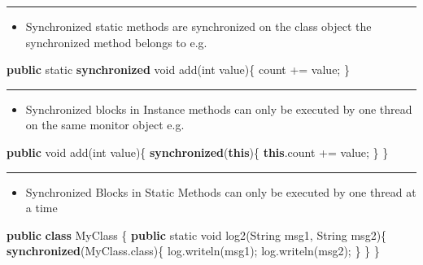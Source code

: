 \documentclass[11pt]{article}
\providecommand{\tightlist}{%
      \setlength{\itemsep}{0pt}\setlength{\parskip}{0pt}}
\newenvironment{Shaded}{}{}
\newcommand{\KeywordTok}[1]{\textcolor[rgb]{0.00,0.44,0.13}{\textbf{{#1}}}}
\newcommand{\DataTypeTok}[1]{\textcolor[rgb]{0.56,0.13,0.00}{{#1}}}
\newcommand{\FunctionTok}[1]{\textcolor[rgb]{0.02,0.16,0.49}{{#1}}}
\newcommand{\NormalTok}[1]{{#1}}
\newcommand{\BuiltInTok}[1]{{#1}}
\begin{document}
\begin{center}\rule{0.5\linewidth}{\linethickness}\end{center}

\begin{itemize}
\tightlist
\item
  Synchronized static methods are synchronized on the class object the
  synchronized method belongs to e.g.
\end{itemize}

\begin{Shaded}
\begin{Highlighting}[]
    \KeywordTok{public} \DataTypeTok{static} \KeywordTok{synchronized} \DataTypeTok{void} \FunctionTok{add}\NormalTok{(}\DataTypeTok{int}\NormalTok{ value)\{}
\NormalTok{        count += value;}
\NormalTok{    \}}
\end{Highlighting}
\end{Shaded}

\begin{center}\rule{0.5\linewidth}{\linethickness}\end{center}

\begin{itemize}
\tightlist
\item
  Synchronized blocks in Instance methods can only be executed by one
  thread on the same monitor object e.g.
\end{itemize}

\begin{Shaded}
\begin{Highlighting}[]
    \KeywordTok{public} \DataTypeTok{void} \FunctionTok{add}\NormalTok{(}\DataTypeTok{int}\NormalTok{ value)\{}
        \KeywordTok{synchronized}\NormalTok{(}\KeywordTok{this}\NormalTok{)\{}
            \KeywordTok{this}\NormalTok{.}\FunctionTok{count}\NormalTok{ += value;   }
\NormalTok{        \}}
\NormalTok{    \} }
\end{Highlighting}
\end{Shaded}

\begin{center}\rule{0.5\linewidth}{\linethickness}\end{center}

\begin{itemize}
\tightlist
\item
  Synchronized Blocks in Static Methods can only be executed by one
  thread at a time
\end{itemize}

\begin{Shaded}
\begin{Highlighting}[]
    \KeywordTok{public} \KeywordTok{class}\NormalTok{ MyClass \{}
        \KeywordTok{public} \DataTypeTok{static} \DataTypeTok{void} \FunctionTok{log2}\NormalTok{(}\BuiltInTok{String}\NormalTok{ msg1, }\BuiltInTok{String}\NormalTok{ msg2)\{}
            \KeywordTok{synchronized}\NormalTok{(MyClass.}\FunctionTok{class}\NormalTok{)\{}
\NormalTok{                log.}\FunctionTok{writeln}\NormalTok{(msg1);}
\NormalTok{                log.}\FunctionTok{writeln}\NormalTok{(msg2);  }
\NormalTok{            \}}
\NormalTok{        \}}
\NormalTok{    \}}
\end{Highlighting}
\end{Shaded}
\end{document}
